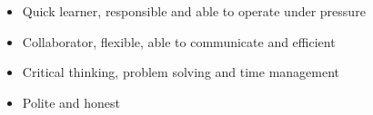 \documentclass[letterpaper]{engineer_cv} %
\begin{document}
	\begin{longList} %
		\longListItem
			{}
			{}
			{}
			{\begin{itemize}
			  \item Quick learner, responsible and able to operate under pressure
			  \item Collaborator, flexible, able to communicate and efficient
              \item Critical thinking, problem solving and time management
              \item Polite and honest
			\end{itemize}}
			{}
			{}
			\\
	\end{longList}



\end{document}
